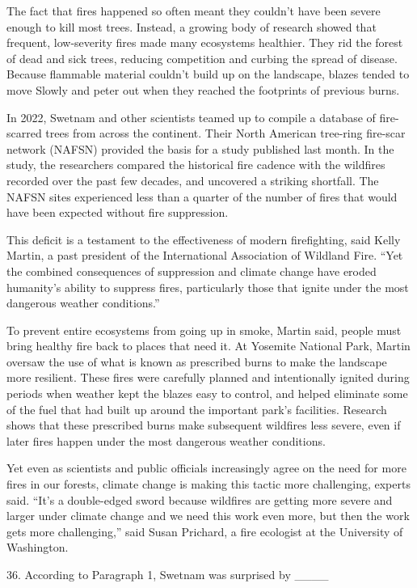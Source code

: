 \documentclass[UTF8,11pt]{ctexart}
\begin{document}
The fact that fires happened so often meant they couldn’t have been severe enough to kill most trees. Instead, a growing body of research showed that frequent, low-severity fires made many ecosystems healthier. They rid the forest of dead and sick trees, reducing competition and curbing the spread of disease. Because flammable material couldn’t build up on the landscape, blazes tended to move Slowly and peter out when they reached the footprints of previous burns.


In 2022, Swetnam and other scientists teamed up to compile a database of fire-scarred trees from across the continent. Their North American tree-ring fire-scar network (NAFSN) provided the basis for a study published last month. In the study, the researchers compared the historical fire cadence with the wildfires recorded over the past few decades, and uncovered a striking shortfall. The NAFSN sites experienced less than a quarter of the number of fires that would have been expected without fire suppression.


This deficit is a testament to the effectiveness of modern firefighting, said Kelly Martin, a past president of the International Association of Wildland Fire. “Yet the combined consequences of suppression and climate change have eroded humanity’s ability to suppress fires, particularly those that ignite under the most dangerous weather conditions.”


To prevent entire ecosystems from going up in smoke, Martin said, people must bring healthy fire back to places that need it. At Yosemite National Park, Martin oversaw the use of what is known as prescribed burns to make the landscape more resilient. These fires were carefully planned and intentionally ignited during periods when weather kept the blazes easy to control, and helped eliminate some of the fuel that had built up around the important park’s facilities. Research shows that these prescribed burns make subsequent wildfires less severe, even if later fires happen under the most dangerous weather conditions.


Yet even as scientists and public officials increasingly agree on the need for more fires in our forests, climate change is making this tactic more challenging, experts said. “It’s a double-edged sword because wildfires are getting more severe and larger under climate change and we need this work even more, but then the work gets more challenging,” said Susan Prichard, a fire ecologist at the University of Washington.


36. According to Paragraph 1, Swetnam was surprised by \_\_\_\_
\end{document}
